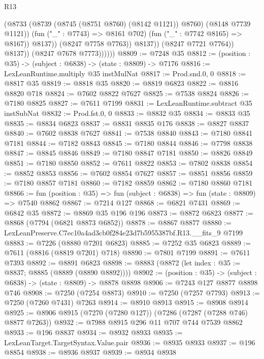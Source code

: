 \begin{lexlean}{R13}
\begin{coremodule}
                                (@8733
                                  (@8739 (@8745 (@8751 @8760) (@8142 @1121)) @8760)
                                  (@8148 @7739 @1121))
                                (fun ("_" : @7743) => @8161 @702)
                                (fun ("_" : @7742 @8165) => @8167))
                              @8137))
                          (@8247 @7758 @7763))
                        @8137))
                    (@8247 @7721 @7764))
                  @8137))
              (@8247 @7678 @7773))))))
@8809 := @7248 @35
@8812 := (position : @35) -> (subject : @6838) -> (state : @8809) -> @7176
@8816 := LexLeanRuntime.multiply @35 instMulNat
@8817 := Prod.snd.{0, 0}
@8818 := @8817 @35
@8819 := @8818 @35
@8820 := @8819 @6823
@8822 := @8816 @8820 @718
@8824 := @7602 @8822 @7627
@8825 := @7538 @8824
@8826 := @7180 @8825
@8827 := @7611 @7199
@8831 := LexLeanRuntime.subtract @35 instSubNat
@8832 := Prod.fst.{0, 0}
@8833 := @8832 @35
@8834 := @8833 @35
@8835 := @8834 @6823
@8837 := @8831 @8835 @176
@8838 := @8827 @8837
@8840 := @7602 @8838 @7627
@8841 := @7538 @8840
@8843 := @7180 @8841 @7181
@8844 := @7182 @8843
@8845 := @7180 @8844
@8846 := @7798 @8838
@8847 := @8845 @8846
@8849 := @7180 @8847 @7181
@8850 := @8826 @8849
@8851 := @7180 @8850
@8852 := @7611 @8822
@8853 := @7802 @8838
@8854 := @8852 @8853
@8856 := @7602 @8854 @7627
@8857 := @8851 @8856
@8859 := @7180 @8857 @7181
@8860 := @7182 @8859
@8862 := @7180 @8860 @7181
@8866 := fun (position : @35) => fun (subject : @6838) => fun (state : @8809) => @7540 @8862
@8867 := @7214 @127
@8868 := @6821 @7431
@8869 := @6842 @35
@8872 := @8869 @35 @196 @196
@8873 := @8872 @6823
@8877 := @8868 (@7794 (@6821 @8873 @6852))
@8878 := @8867 @8877
@8880 := LexLeanPreserve.C7ec10a4ad3cb0f284e23d7b5955387bf.R13.__fits_9 @7199
@8883 := @7226 (@8880 @7201 @6823)
@8885 := @7252 @35 @6823
@8889 := @7611 (@8816 (@8819 @7201) @718)
@8890 := @7801 @7199
@8891 := @7611 @7393
@8892 := @8891 @6823
@8898 := @8883 (@8872 (let index : @35 := @8837; @8885 (@8889 (@8890 @8892))))
@8902 := (position : @35) -> (subject : @6838) -> (state : @8809) -> @8878 @8898
@8906 := @7243 @127 @8877 @8898 @746
@8908 := @7250 (@7254 @8873)
@8910 := @7250 (@7257 @7793)
@8913 := @7250 (@7260 @7431) @7263
@8914 := @8910 @8913
@8915 := @8908 @8914
@8925 := @8906 @8915 (@7270 (@7280 @127)) (@7286 (@7287 (@7288 @746) @8877 @7263))
@8932 := @7988 @8915 @296 @11 @707 @744 @7539 @8862
@8933 := @196 @8837
@8934 := @8932 @8933
@8935 := LexLeanTarget.TargetSyntax.Value.pair
@8936 := @8935 @8933
@8937 := @196 @8854
@8938 := @8936 @8937
@8939 := @8934 @8938

\end{coremodule}
\end{lexlean}
